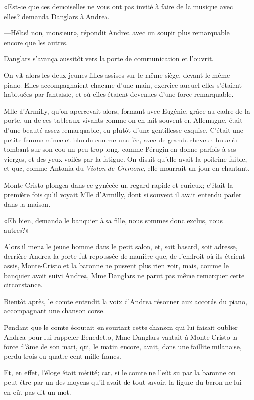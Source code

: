 «Est-ce que ces demoiselles ne vous ont pas invité à faire de la musique avec elles? demanda Danglars à Andrea. 

—Hélas! non, monsieur», répondit Andrea avec un soupir plus remarquable encore que les autres. 

Danglars s'avança aussitôt vers la porte de communication et l'ouvrit. 

On vit alors les deux jeunes filles assises sur le même siège, devant le même piano. Elles accompagnaient chacune d'une main, exercice auquel elles s'étaient habituées par fantaisie, et où elles étaient devenues d'une force remarquable. 

Mlle d'Armilly, qu'on apercevait alors, formant avec Eugénie, grâce au cadre de la porte, un de ces tableaux vivants comme on en fait souvent en Allemagne, était d'une beauté assez remarquable, ou plutôt d'une gentillesse exquise. C'était une petite femme mince et blonde comme une fée, avec de grands cheveux bouclés tombant sur son cou un peu trop long, comme Pérugin en donne parfois à ses vierges, et des yeux voilés par la fatigue. On disait qu'elle avait la poitrine faible, et que, comme Antonia du \textit{Violon de Crémone}, elle mourrait un jour en chantant. 

Monte-Cristo plongea dans ce gynécée un regard rapide et curieux; c'était la première fois qu'il voyait Mlle d'Armilly, dont si souvent il avait entendu parler dans la maison. 

«Eh bien, demanda le banquier à sa fille, nous sommes donc exclus, nous autres?» 

Alors il mena le jeune homme dans le petit salon, et, soit hasard, soit adresse, derrière Andrea la porte fut repoussée de manière que, de l'endroit où ils étaient assis, Monte-Cristo et la baronne ne pussent plus rien voir, mais, comme le banquier avait suivi Andrea, Mme Danglars ne parut pas même remarquer cette circonstance. 

Bientôt après, le comte entendit la voix d'Andrea résonner aux accords du piano, accompagnant une chanson corse. 

Pendant que le comte écoutait en souriant cette chanson qui lui faisait oublier Andrea pour lui rappeler Benedetto, Mme Danglars vantait à Monte-Cristo la force d'âme de son mari, qui, le matin encore, avait, dans une faillite milanaise, perdu trois ou quatre cent mille francs. 

Et, en effet, l'éloge était mérité; car, si le comte ne l'eût su par la baronne ou peut-être par un des moyens qu'il avait de tout savoir, la figure du baron ne lui en eût pas dit un mot. 

